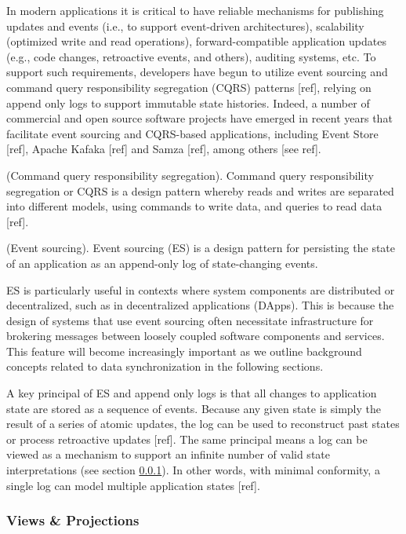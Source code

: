 \documentclass{comjnl}
\begin{document}
In modern applications it is critical to have reliable mechanisms for publishing updates and events (i.e., to support event-driven architectures), scalability (optimized write and read operations), forward-compatible application updates (e.g., code changes, retroactive events, and others), auditing systems, etc. To support such requirements, developers have begun to utilize event sourcing and command query responsibility segregation (CQRS) patterns [ref], relying on append only logs to support immutable state histories. Indeed, a number of commercial and open source software projects have emerged in recent years that facilitate event sourcing and CQRS-based applications, including Event Store [ref], Apache Kafaka [ref] and Samza [ref], among others [see ref]. 

\begin{definition} (Command query responsibility segregation). Command query responsibility segregation or CQRS is a design pattern whereby reads and writes are separated into different models, using commands to write data, and queries to read data [ref]. \end{definition}

\begin{definition} (Event sourcing). Event sourcing (ES) is a design pattern for persisting the state of an application as an append-only log of state-changing events. \end{definition}

ES is particularly useful in contexts where system components are distributed or decentralized, such as in decentralized applications (DApps). This is because the design of systems that use event sourcing often necessitate infrastructure for brokering messages between loosely coupled software components and services. This feature will become increasingly important as we outline background concepts related to data synchronization in the following sections. 

A key principal of ES and append only logs is that all changes to application state are stored as a sequence of events. Because any given state is simply the result of a series of atomic updates, the log can be used to reconstruct past states or process retroactive updates [ref]. The same principal means a log can be viewed as a mechanism to support an infinite number of valid state interpretations (see section  \ref{sec:viewsprojections}). In other words, with minimal conformity, a single log can model multiple application states [ref].

\subsubsection{Views \& Projections} \label{sec:viewsprojections}
\end{document}
